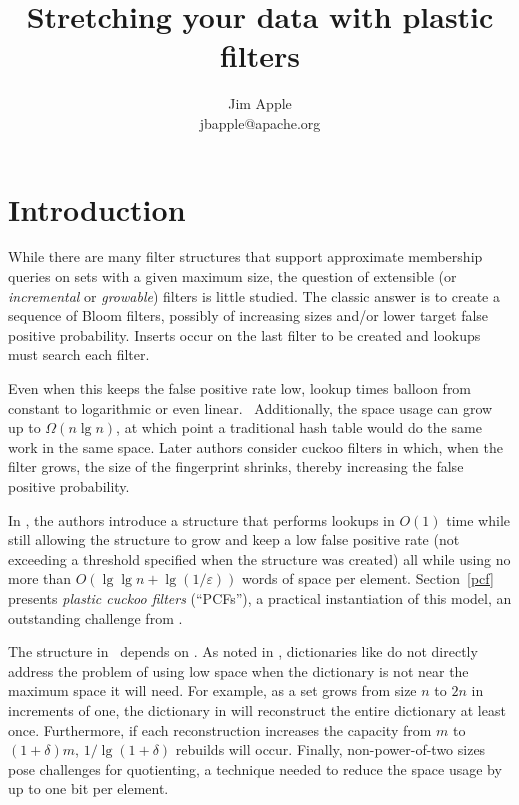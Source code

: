 \documentclass[letterpaper, 11pt]{article}
\begin{document}
\title{Stretching your data with plastic filters}
\author{Jim Apple \\
  jbapple@apache.org}

\maketitle


\section{Introduction}
While there are many filter structures that support approximate membership queries on sets with a given maximum size, the question of extensible (or {\em incremental} or {\em growable}) filters is little studied.
The classic answer is to create a sequence of Bloom filters, possibly of increasing sizes and/or lower target false positive probability.
Inserts occur on the last filter to be created and lookups must search each filter.

Even when this keeps the false positive rate low, lookup times balloon from constant to logarithmic or even linear.~\cite{psw,logarithm,consistent-cuckoo} %
Additionally, the space usage can grow up to $\Omega(n \lg n)$, at which point a traditional hash table would do the same work in the same space.
Later authors consider cuckoo filters in which, when the filter grows, the size of the fingerprint shrinks, thereby increasing the false positive probability.~\cite{logarithm,morton-journal,vacuum,rsqf}

In \cite{psw}, the authors introduce a structure that performs lookups in $O(1)$ time while still allowing the structure to grow and keep a low false positive rate (not exceeding a threshold specified when the structure was created) all while using no more than $O(\lg \lg n + \lg (1/\varepsilon))$ words of space per element.
Section~\ref{pcf} presents {\em plastic cuckoo filters} (``PCFs''), a practical instantiation of this model, an outstanding challenge from \cite{psw}.

The structure in~\cite{psw} depends on \cite{succinct}.
As noted in \cite{dysect}, dictionaries like \cite{succinct} do not directly address the problem of using low space when the dictionary is not near the maximum space it will need.
For example, as a set grows from size $n$ to $2n$ in increments of one, the dictionary in \cite{succinct} will reconstruct the entire dictionary at least once.
Furthermore, if each reconstruction increases the capacity from $m$ to $(1 + \delta)m$, $1/\lg(1+\delta)$ rebuilds will occur.
Finally, non-power-of-two sizes pose challenges for quotienting, a technique needed to reduce the space usage by up to one bit per element.~\cite{change-your-base, cleary-quotient}
\end{document}
